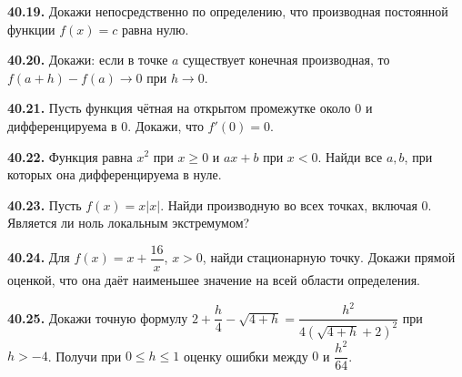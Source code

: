 \ifdim\dimexpr\ht\CatFlowBox+\dp\CatFlowBox\relax<64mm\dp\CatFlowBox=\dimexpr64mm-\ht\CatFlowBox\relax\fi%
\noindent\usebox{\CatFlowBox}\par\addvspace{5pt}

\noindent\begin{minipage}[t]{\linewidth}\textbf{40.19.} Докажи непосредственно по определению, что производная постоянной функции \(f(x)=c\) равна нулю.\par\end{minipage}\par
\noindent\begin{minipage}[t]{\linewidth}\textbf{40.20.} Докажи: если в точке \(a\) существует конечная производная, то \(f(a+h)-f(a)\to0\) при \(h\to0\).\par\end{minipage}\par
\noindent\begin{minipage}[t]{\linewidth}\textbf{40.21.} Пусть функция чётная на открытом промежутке около \(0\) и дифференцируема в \(0\). Докажи, что \(f'(0)=0\).\par\end{minipage}\par
\noindent\begin{minipage}[t]{\linewidth}\textbf{40.22.}\starmark{} Функция равна \(x^2\) при \(x\ge0\) и \(ax+b\) при \(x<0\). Найди все \(a,b\), при которых она дифференцируема в нуле.\par\end{minipage}\par
\noindent\begin{minipage}[t]{\linewidth}\textbf{40.23.}\starmark{} Пусть \(f(x)=x|x|\). Найди производную во всех точках, включая \(0\). Является ли ноль локальным экстремумом?\par\end{minipage}\par
\noindent\begin{minipage}[t]{\linewidth}\textbf{40.24.}\starmark{} Для \(f(x)=x+\dfrac{16}{x}\), \(x>0\), найди стационарную точку. Докажи прямой оценкой, что она даёт наименьшее значение на всей области определения.\par\end{minipage}\par
\noindent\begin{minipage}[t]{\linewidth}\textbf{40.25.}\starmark{} Докажи точную формулу \(2+\dfrac h4-\sqrt{4+h}=\dfrac{h^2}{4(\sqrt{4+h}+2)^2}\) при \(h>-4\). Получи при \(0\le h\le1\) оценку ошибки между \(0\) и \(\dfrac{h^2}{64}\).\par\end{minipage}\par
